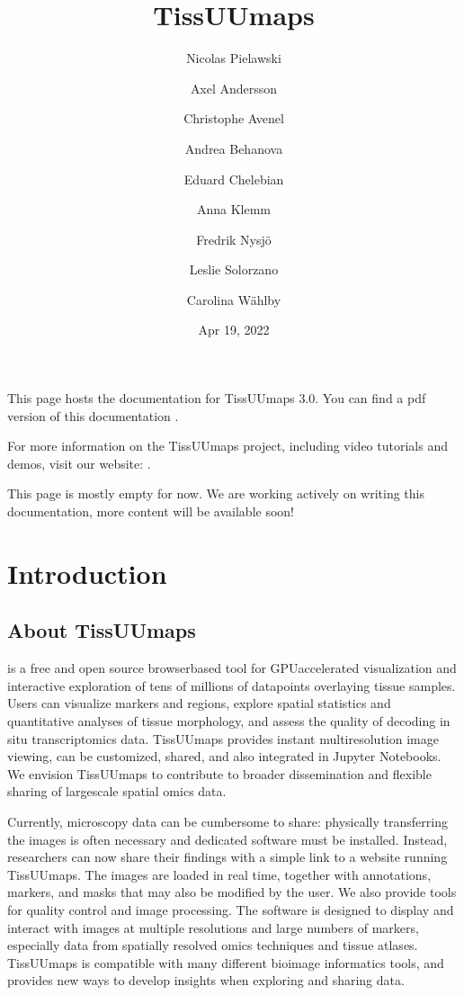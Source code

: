 \documentclass[letterpaper,10pt,english,openany,oneside]{sphinxmanual}
\title{TissUUmaps}
\date{Apr 19, 2022}
\author{Nicolas Pielawski\and Axel Andersson\and Christophe Avenel\and Andrea Behanova\and Eduard Chelebian\and Anna Klemm\and Fredrik Nysjö\and Leslie Solorzano\and Carolina Wählby}
\begin{document}
\pagestyle{empty}
\sphinxmaketitle
\pagestyle{plain}
\sphinxtableofcontents
\pagestyle{normal}
\label{\detokenize{index::doc}}


\sphinxAtStartPar
This page hosts the documentation for TissUUmaps 3.0. You can find a pdf version of this documentation .

\sphinxAtStartPar
For more information on the TissUUmaps project, including video tutorials and demos, visit our website: .

\begin{sphinxShadowBox}

\sphinxAtStartPar
This page is mostly empty for now. We are working actively on writing this documentation, more content will be available soon!
\end{sphinxShadowBox}

\sphinxstepscope


\chapter{Introduction}
\label{\detokenize{docs/intro/index:introduction}}\label{\detokenize{docs/intro/index::doc}}
\sphinxstepscope


\section{About TissUUmaps}
\label{\detokenize{docs/intro/about:about-tissuumaps}}\label{\detokenize{docs/intro/about::doc}}
\sphinxAtStartPar
{} is a free and open source browser\sphinxhyphen{}based tool for GPU\sphinxhyphen{}accelerated visualization and interactive exploration of tens of millions of datapoints overlaying tissue samples. Users can visualize markers and regions, explore spatial statistics and quantitative analyses of tissue morphology, and assess the quality of decoding in situ transcriptomics data. TissUUmaps provides instant multi\sphinxhyphen{}resolution image viewing, can be customized, shared, and also integrated in Jupyter Notebooks. We envision TissUUmaps to contribute to broader dissemination and flexible sharing of large\sphinxhyphen{}scale spatial omics data.

\sphinxAtStartPar
Currently, microscopy data can be cumbersome to share: physically transferring the images is often necessary and dedicated software must be installed. Instead, researchers can now share their findings with a simple link to a website running TissUUmaps. The images are loaded in real time, together with annotations, markers, and masks that may also be modified by the user. We also provide tools for quality control and image processing. The software is designed to display and interact with images at multiple resolutions and large numbers of markers, especially data from spatially resolved omics techniques and tissue atlases. TissUUmaps is compatible with many different bioimage informatics tools, and provides new ways to develop insights when exploring and sharing data.
\end{document}
